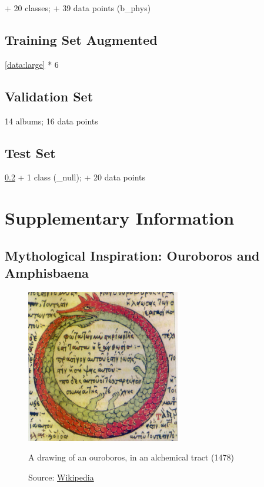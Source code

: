 \begin{uomappendix}
                + 20 classes; + 39 data points (b_phys)
    
            \subsection{Training Set Augmented} \label{data:aug}
    
                \ref{data:large} * 6
    
            \subsection{Validation Set} \label{data:val}
    
                14 albums; 16 data points
    
            \subsection{Test Set} \label{data:test}
    
                \ref{data:val} + 1 class (\_null); + 20 data points
    
        \section{Supplementary Information}
    
            \subsection{Mythological Inspiration: Ouroboros and Amphisbaena}
    
                \begin{figure}[h]
                    \centering
                    \includegraphics[width=0.6\textwidth]{images/Ouroborus.jpg}
                    \caption{A drawing of an ouroboros, in an alchemical tract (1478)}
                    \label{fig:ouroboros}
                    \caption*{Source: \href{https://en.wikipedia.org/wiki/File:Serpiente_alquimica.jpg}{Wikipedia}}
                \end{figure}
    

\end{uomappendix}
